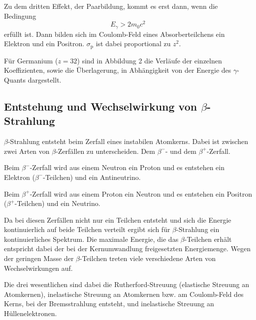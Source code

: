 \documentclass[
  bibliography=totoc,     %
  captions=tableheading,  %
  titlepage=firstiscover, %
]{scrartcl}
\begin{document}
\noindent
Zu dem dritten Effekt, der Paarbildung, kommt es erst dann, wenn die Bedingung
\begin{equation}
  E_\gamma > 2 m_0 c^2
\end{equation}
erfüllt ist. Dann bilden sich im Coulomb-Feld eines Absorberteilchens ein Elektron
und ein Positron. $\sigma_\mathup{p}$ ist dabei proportional zu $z^2$.

\noindent
Für Germanium ($z = 32$) sind in Abbildung 2 die Verläufe der einzelnen
Koeffizienten, sowie die Überlagerung, in Abhängigkeit von der Energie des
$\gamma$-Quants dargestellt.

\subsection{Entstehung und Wechselwirkung von \texorpdfstring{$\beta$}{beta}-Strahlung}
$\beta$-Strahlung entsteht beim Zerfall eines instabilen Atomkerns.
Dabei ist zwischen zwei Arten von $\beta$-Zerfällen zu unterscheiden.
Dem $\beta^-$- und dem $\beta^+$-Zerfall.

\noindent
Beim $\beta^-$-Zerfall wird aus einem Neutron ein Proton und es entstehen
ein Elektron ($\beta^-$-Teilchen) und ein Antineutrino.

\noindent
Beim $\beta^+$-Zerfall wird aus einem Proton ein Neutron und es entstehen
ein Positron ($\beta^+$-Teilchen) und ein Neutrino.

\noindent
Da bei diesen Zerfällen nicht nur ein Teilchen entsteht und sich die Energie
kontinuierlich auf beide Teilchen verteilt ergibt sich für $\beta$-Strahlung
ein kontinuierliches Spektrum. Die maximale Energie, die das $\beta$-Teilchen
erhält entspricht dabei der bei der Kernumwandlung freigesetzten Energiemenge.
Wegen der geringen Masse der $\beta$-Teilchen treten viele verschiedene Arten
von Wechselwirkungen auf.

\noindent
Die drei wesentlichen sind dabei die Rutherford-Streuung (elastische Streuung
an Atomkernen), inelastische Streuung an Atomkernen bzw. am Coulomb-Feld des
Kerns, bei der Bremsstrahlung entsteht, und inelastische Streuung an
Hüllenelektronen.
\end{document}
